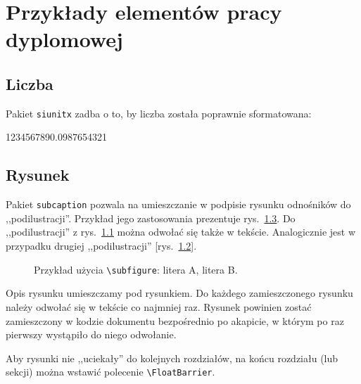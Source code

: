 \chapter{Przykłady elementów pracy dyplomowej}
\label{cha:przyklady}

\section{Liczba}

Pakiet \texttt{siunitx} zadba o to, by liczba została poprawnie sformatowana: \\
\begin{center}
	\num{1234567890.0987654321}
\end{center}


\section{Rysunek}

Pakiet \texttt{subcaption} pozwala na umieszczanie w podpisie rysunku odnośników do ,,podilustracji''. Przykład jego zastosowania prezentuje rys.~\ref{fig:subfigure_example}. Do ,,podilustracji'' z rys.~\ref{subfig:a} można odwołać się także w tekście. Analogicznie jest w przypadku drugiej ,,podilustracji'' [rys.~\ref{subfig:b}].

\begin{figure}[h]
	\centering
	\begin{subfigure}[b]{0.35\textwidth}
		\centering
		\caption{}
        \label{subfig:a}
	\end{subfigure}
	\begin{subfigure}[b]{0.35\textwidth}
		\centering
        \caption{}
		\label{subfig:b}
	\end{subfigure}

	\caption{Przykład użycia \texttt{\textbackslash subfigure}:  litera A,  litera B.}
    \label{fig:subfigure_example}
\end{figure}

Opis rysunku umieszczamy pod rysunkiem. Do każdego zamieszczonego rysunku należy odwołać się w tekście co najmniej raz. Rysunek powinien zostać zamieszczony w kodzie dokumentu bezpośrednio po akapicie, w którym po raz pierwszy wystąpiło do niego odwołanie.

Aby rysunki nie ,,uciekały'' do kolejnych rozdziałów, na końcu rozdziału (lub sekcji) można wstawić polecenie \texttt{\textbackslash FloatBarrier}.

